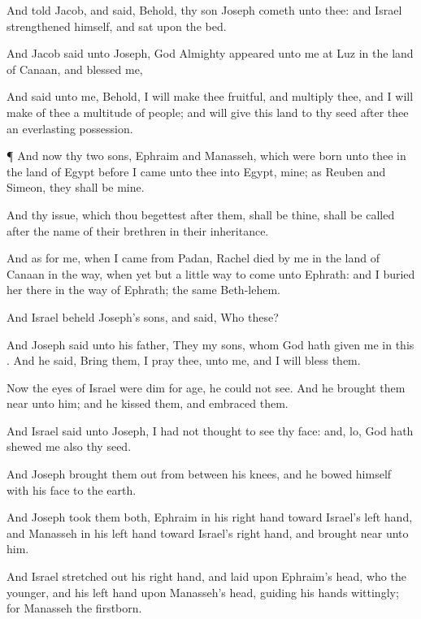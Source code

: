 {And
{}
told
Jacob, and
said, Behold, thy
son
Joseph
cometh unto thee: and
Israel
strengthened himself, and
sat upon the
bed.

And
Jacob
said unto
Joseph,
God
Almighty
appeared unto me at
Luz in the
land of
Canaan, and
blessed me,

And
said unto me, Behold, I will make thee
fruitful, and
multiply thee, and I will
make of thee a
multitude of
people; and will
give this
land to thy
seed after
thee
{} an
everlasting
possession.


\par }{\PP {}¶ And now thy
two
sons,
Ephraim and
Manasseh, which were
born unto thee in the
land of
Egypt
before I
came unto thee into
Egypt,
{} mine; as
Reuben and
Simeon, they shall be mine.

And thy
issue, which thou
begettest
after them, shall be thine,
{} shall be
called
after the
name of their
brethren in their
inheritance.

And as for me, when I
came from
Padan,
Rachel
died by me in the
land of
Canaan in the
way,
when yet
{} but a
little
way to
come unto
Ephrath: and I buried
her there in the
way of
Ephrath; the same
{}
Beth-lehem.


\par }{\PP {}And
Israel
beheld
Joseph’s
sons, and
said, Who
{} these?

And
Joseph
said unto his
father, They
{} my
sons, whom
God hath
given me in this
{}. And he
said, Bring
them, I pray thee, unto me, and I will
bless them.

Now the
eyes of
Israel were
dim for
age,
{} he
could not
see. And he brought them
near unto him; and he
kissed them, and
embraced them.

And
Israel
said unto
Joseph, I had not
thought to
see thy
face: and, lo,
God hath
shewed me also thy
seed.

And
Joseph brought them
out from
between his
knees, and he
bowed himself with his
face to the
earth.

And
Joseph
took them
both,
Ephraim in his right
hand toward
Israel’s left
hand, and
Manasseh in his left
hand toward
Israel’s right
hand, and brought
{}
near unto him.

And
Israel stretched
out his right
hand, and
laid
{} upon
Ephraim’s
head, who
{} the
younger, and his left
hand upon
Manasseh’s
head,
guiding his
hands
wittingly; for
Manasseh
{} the
firstborn.


}

